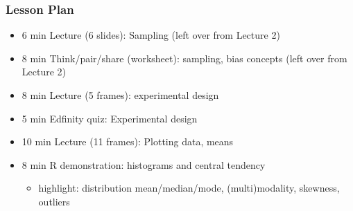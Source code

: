 \begin{frame}
    \frametitle{Lesson Plan}
    \begin{itemize}
        \item 6 min Lecture (6 slides): Sampling (left over from Lecture 2)
        \item 8 min Think/pair/share (worksheet): sampling, bias concepts (left over from Lecture 2)
        \item 8 min Lecture (5 frames): experimental design
        \item 5 min Edfinity quiz: Experimental design
        \item 10 min Lecture (11 frames): Plotting data, means
        \item 8 min R demonstration: histograms and central tendency
        \begin{itemize}
            \item  highlight: distribution mean/median/mode, (multi)modality, skewness, outliers
        \end{itemize}


     \end{itemize}
\end{frame}

